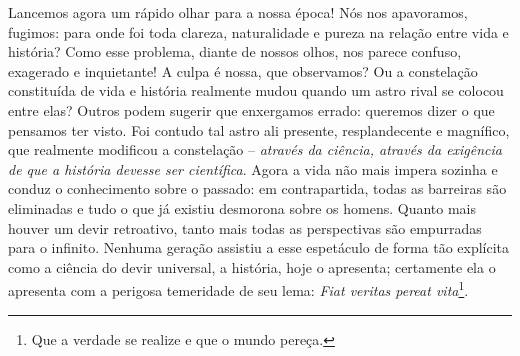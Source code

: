    Lancemos agora um rápido olhar para a nossa época! Nós nos
    apavoramos, fugimos: para onde foi toda clareza, naturalidade e
    pureza na relação entre vida e história? Como esse problema, diante
    de nossos olhos, nos parece confuso, exagerado e inquietante! A
    culpa é nossa, que observamos? Ou a constelação constituída de vida
    e história realmente mudou quando um astro rival se colocou entre
    elas? Outros podem sugerir que enxergamos errado: queremos dizer o
    que pensamos ter visto. Foi contudo tal astro ali presente,
    resplandecente e magnífico, que realmente modificou a constelação --
    \emph{através da ciência, através da exigência de que a história
    devesse ser científica}. Agora a vida não mais impera sozinha e
    conduz o conhecimento sobre o passado: em contrapartida, todas as
    barreiras são eliminadas e tudo o que já existiu desmorona sobre os
    homens. Quanto mais houver um devir retroativo, tanto mais todas as
    perspectivas são empurradas para o infinito. Nenhuma geração
    assistiu a esse espetáculo de forma tão explícita como a ciência do
    devir universal, a história, hoje o apresenta; certamente ela o
    apresenta com a perigosa temeridade de seu lema: \emph{Fiat veritas
    pereat vita}\footnote{Que a verdade se realize e que o mundo pereça.}.

